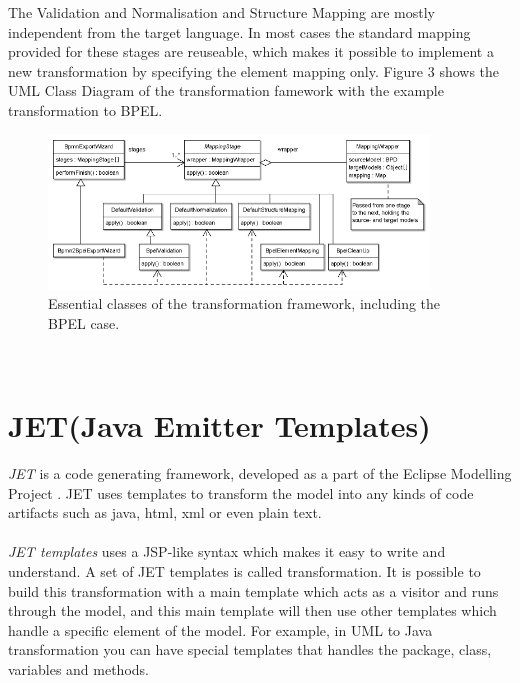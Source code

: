 The Validation and Normalisation and Structure Mapping are mostly independent from the target language. In most cases the standard mapping provided for these stages are reuseable, which makes it possible to implement a new transformation by specifying the element mapping only. Figure 3 shows the UML Class Diagram of the transformation famework with the example transformation to BPEL.
\begin{figure}[h]
	\centering
		\includegraphics[width=0.90\textwidth]{images/transformation.png}
	\caption{Essential classes of the transformation framework, including the BPEL case.\cite{3}}
	\label{fig:transform}
\end{figure}\\


\section{JET(Java Emitter Templates)}
\textit{JET}\cite{13} is a code generating framework, developed as a part of the Eclipse Modelling Project \cite{14}. JET uses templates to transform the model into any kinds of code artifacts such as java, html, xml or even plain text. \\\\
\textit{JET templates} uses a JSP-like syntax which makes it easy to write and understand. A set of JET templates is called transformation. It is possible to build this transformation with a main template which acts as a visitor and runs through the model, and this main template will then use other templates which handle a specific element of the model. For example, in UML to Java transformation you can have special templates that handles the package, class, variables and methods.
